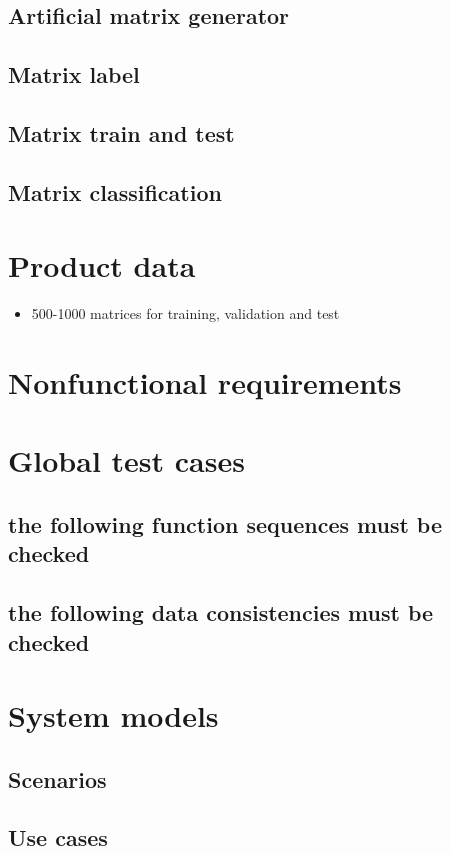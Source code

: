 \documentclass[parskip=full]{scrartcl}
\begin{document}
\subsection{Artificial matrix generator}
\subsection{Matrix label}
\subsection{Matrix train and test}
\subsection{Matrix classification }

\section{Product data}
\begin{itemize}
\item 500-1000 matrices for training, validation and test
\end{itemize}

\section{Nonfunctional requirements}

\section{Global test cases}
\subsection{the following function sequences must be checked}
\subsection{the following data consistencies must be checked}

\section{System models}
\subsection{Scenarios}
\subsection{Use cases}
\end{document}
